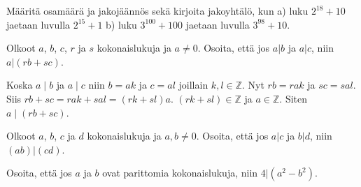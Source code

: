 \begin{tehtavasivu}
\begin{tehtava}
    \begin{vastaus}
    \end{vastaus}
\end{tehtava}

\begin{tehtava}
	Määritä osamäärä ja jakojäännös sekä kirjoita jakoyhtälö, kun a) luku $2^{18} + 10$ jaetaan luvulla $2^{15} + 1$ b) luku $3^{100} + 100$ jaetaan luvulla $3^{98} + 10$.
    \begin{vastaus}
    \end{vastaus}
\end{tehtava}

\begin{tehtava}
	Olkoot $a$, $b$, $c$, $r$ ja $s$ kokonaislukuja ja $a \neq 0$. Osoita, että jos $a|b$ ja $a|c$, niin $a|(rb + sc)$.
    \begin{vastaus}
        Koska $a\mid b$ ja $a\mid c$ niin $b = ak$ ja $c = al$ joillain $k, l \in \mathbb{Z}$. Nyt $rb = rak$ ja $sc = sal$. Siis $rb +sc = rak + sal = (rk + sl)a$. $(rk +sl) \in \mathbb{Z}$ ja $a\in \mathbb{Z}$. Siten $a\mid(rb+sc)$.
    \end{vastaus}
\end{tehtava}

\begin{tehtava}
	Olkoot $a$, $b$, $c$ ja $d$ kokonaislukuja ja $a, b \neq 0$. Osoita, että jos $a|c$ ja $b|d$, niin $(ab)|(cd)$.
\end{tehtava}

\begin{tehtava}
	Osoita, että jos $a$ ja $b$ ovat parittomia kokonaislukuja, niin $4 | (a^2 - b^2)$.
\end{tehtava}


\end{tehtavasivu}
